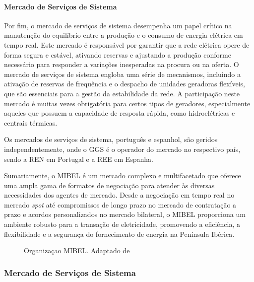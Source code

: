 \paragraph{Mercado de Serviços de Sistema \label{se:servicos_sistema_mibel}}
\text{ }  \par
Por fim, o mercado de serviços de sistema desempenha um papel crítico na manutenção do equilíbrio entre a produção e o consumo de energia elétrica em tempo real. Este mercado é responsável por garantir que a rede elétrica opere de forma segura e estável, ativando reservas e ajustando a produção conforme necessário para responder a variações inesperadas na procura ou na oferta. O mercado de serviços de sistema engloba uma série de mecanismos, incluindo a ativação de reservas de frequência e o despacho de unidades geradoras flexíveis, que são essenciais para a gestão da estabilidade da rede. A participação neste mercado é muitas vezes obrigatória para certos tipos de geradores, especialmente aqueles que possuem a capacidade de resposta rápida, como hidroelétricas e centrais térmicas.\par
Os mercados de serviços de sistema, português e espanhol, são geridos independentemente, onde o \gls{GGS} é o operador do mercado no respectivo país, sendo a \gls{REN} em Portugal e a \gls{REE} em Espanha.\par
\bigskip
\bigskip
Sumariamente, o \gls{MIBEL} é um mercado complexo e multifacetado que oferece uma ampla gama de formatos de negociação para atender às diversas necessidades dos agentes de mercado. Desde a negociação em tempo real no mercado \textit{spot} até compromissos de longo prazo no mercado de contratação a prazo e acordos personalizados no mercado bilateral, o \gls{MIBEL} proporciona um ambiente robusto para a transação de eletricidade, promovendo a eficiência, a flexibilidade e a segurança do fornecimento de energia na Península Ibérica.\cite{Rassid2017}\par



\begin{figure}[H]
	\centering
	\resizebox{\linewidth}{!}{}
	\caption{Organizaçao MIBEL. Adaptado de \cite{Rassid2017}}
	\label{fig:mibel_org}
\end{figure}




\subsubsection{Mercado de Serviços de Sistema \label{se:servicos_sistema}}

